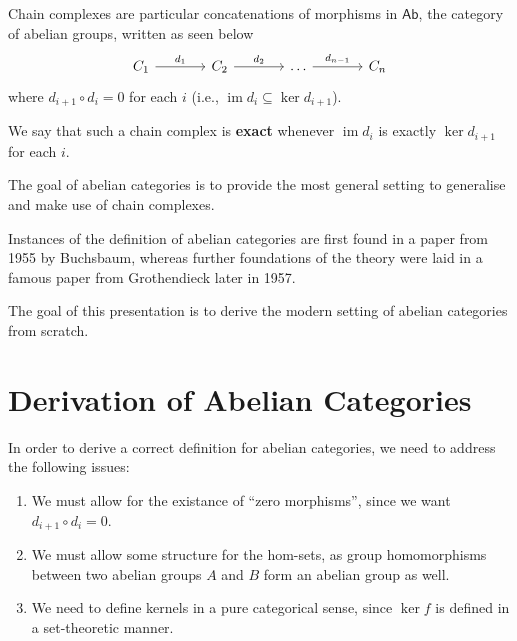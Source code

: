\documentclass{beamer}
\DeclareMathOperator{\im}{im}
\newcommand{\cat}[1]{\mathsf{#1}}
\begin{document}
\begin{frame}
    Chain complexes are particular concatenations of morphisms in $\cat{Ab}$, the
    category of abelian groups, written as seen below
    \[\begin{tikzcd}[sep=large, ampersand replacement=\&]
        {C_1} \& {C_2} \& \ldots \& {C_n}
        \arrow["{d_1}", from=1-1, to=1-2]
        \arrow["{d_2}", from=1-2, to=1-3]
        \arrow["{d_{n-1}}", from=1-3, to=1-4]
    \end{tikzcd}\]
    where $d_{i+1} \circ d_i = 0$ for each $i$ (i.e., $\im d_i \subseteq \ker d_{i+1}$). \smallskip

    We say that such a chain complex is \textbf{exact} whenever $\im d_i$ is exactly
    $\ker d_{i+1}$ for each $i$.
\end{frame}

\begin{frame}
    The goal of abelian categories is to provide the most general setting to
    generalise and make use of chain complexes. \medskip
    
    Instances of the definition of abelian
    categories are first found in a paper from 1955 by Buchsbaum, whereas further
    foundations of the theory were laid in a famous paper from
    Grothendieck later in 1957. \medskip

    The goal of this presentation is to derive the modern setting of
    abelian categories from scratch.
\end{frame}


\section{Derivation of Abelian Categories}

\begin{frame}
    In order to derive a correct definition for
    abelian categories, we need to address the following issues:
    \begin{enumerate}
        \item We must allow for the existance of ``zero morphisms'',
            since we want $d_{i+1} \circ d_i = 0$.
        \item We must allow some structure for the hom-sets, as
            group homomorphisms between two abelian groups $A$ and
            $B$ form an abelian group as well.
        \item We need to define kernels in a pure categorical sense,
            since $\ker f$ is defined in a set-theoretic manner. 
    \end{enumerate}
\end{frame}
\end{document}
